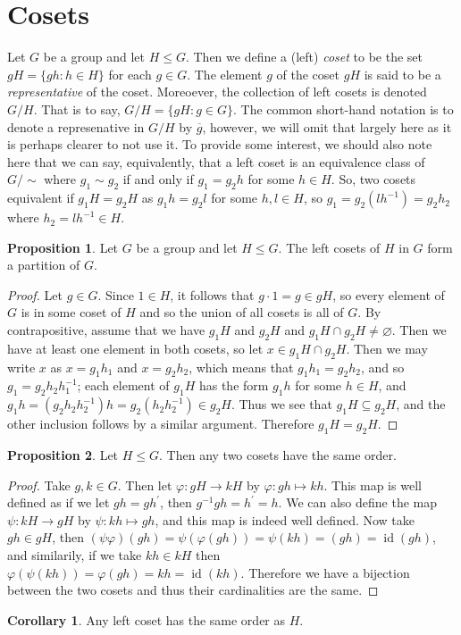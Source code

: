 \documentclass[9pt,reqno]{amsart}
\theoremstyle{definition}
\newtheorem{prop}{Proposition}[section]
\newtheorem{coro}{Corollary}[section]
\DeclareMathOperator{\id}{id}
\newcommand{\pp}{\prime}
\begin{document}
\section{Cosets}
Let $G$ be a group and let $H \leq G$. Then we define a (left) \textit{coset} to be the set $gH = \{ gh \colon h \in H \}$ for each $g \in G$. The element $g$ of the coset $gH$ is said to be a \textit{representative} of the coset. Moreoever, the collection of left cosets is denoted $G/H$. That is to say, $G/H = \{gH \colon g \in G \}$. The common short-hand notation is to denote a represenative in $G/H$ by $\overline{g}$, however, we will omit that largely here as it is perhaps clearer to not use it. To provide some interest, we should also note here that we can say, equivalently, that a left coset is an equivalence class of $G/\sim$ where $g_1 \sim g_2$ if and only if $g_1 = g_2 h$ for some $h \in H$. So, two cosets equivalent if $g_1 H = g_2 H$ as $g_1 h = g_2 l$ for some $h, l \in H$, so $g_1 = g_2 (lh^{-1})= g_2 h_2$ where $h_2 = lh^{-1} \in H$.  
\begin{prop}
	Let $G$ be a group and let $H \leq G$. The left cosets of $H$ in $G$ form a partition of $G$. 
\end{prop}

\begin{proof}
	Let $g \in G$. Since $1 \in H$, it follows that $g \cdot 1 = g \in g H$, so every element of $G$ is in some coset of $H$ and so the union of all cosets is all of $G$. By contrapositive, assume that we have $g_1 H$ and $g_2 H$ and $g_1 H \cap g_2 H \neq \varnothing$. Then we have at least one element in both cosets, so let $x \in g_1 H \cap g_2 H$. Then we may write $x$ as $x = g_1 h_1$ and $x = g_2 h_2$, which means that $g_1 h_1 = g_2 h_2$, and so $g_1 = g_2 h_2 h_1^{-1}$; each element of $g_1H$ has the form $g_1 h$ for some $h \in H$, and $g_1 h = (g_2 h_2 h^{-1}_2) h  = g_2 (h_2 h^{-1}_2) \in g_2 H$. Thus we see that $g_1 H \subseteq g_2 H$, and the other inclusion follows by a similar argument. Therefore $g_1 H = g_2 H$.
\end{proof}
\begin{prop} Let $H \leq G$. Then any two cosets have the same order. 
\end{prop}
\begin{proof}
	Take $g, k \in G$. Then let $\varphi \colon gH \to k H$ by $\varphi \colon gh \mapsto kh$. This map is well defined as if we let $gh = gh^\pp$, then $g^{-1} g h = h^\pp = h$. We can also define the map $\psi \colon kH \to gH$ by $\psi \colon kh \mapsto gh$, and this map is indeed well defined. Now take $gh \in gH$, then $(\psi \varphi)(gh) = \psi (\varphi (gh)) = \psi (kh) = (gh) = \id(gh)$, and similarily, if we take $kh \in kH$ then $\varphi (\psi(kh)) = \varphi (gh) = kh = \id(kh)$. Therefore we have a bijection between the two cosets and thus their cardinalities are the same.
\end{proof}
\begin{coro} Any left coset has the same order as $H$. 
\end{coro}
\end{document}
